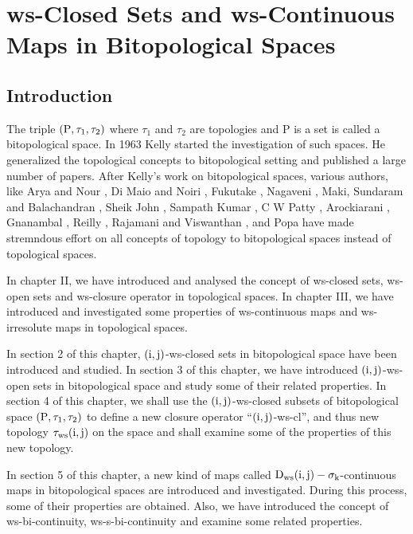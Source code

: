 \chapter{ws-Closed Sets and ws-Continuous Maps in Bitopological Spaces}
\graphicspath{{Chapter8/Chapter8Figs/EPS/}{Chapter8/Chapter8Figs/}}

\section{Introduction}\label{sec8.1}

The triple $(\mathrm{P}, \tau_1, \tau_2)$ where $\tau_1$ and $\tau_2$ are topologies and P is a set is called a bitopological space. In 1963 Kelly \cite{Kelly} started the investigation of such spaces. He generalized the topological concepts to bitopological setting and published a large number of papers. After Kelly's work on bitopological spaces, various authors, like Arya and Nour \cite{Arya2}, Di Maio and Noiri \cite{Noiri2}, Fukutake \cite{Fukutake2}, Nagaveni \cite{Nagaveni7}, Maki, Sundaram and Balachandran \cite{Maki6}, Sheik John \cite{Sheik1}, Sampath Kumar \cite{SampathKumar}, C W Patty \cite{Patty}, Arockiarani \cite{Arockiarani}, Gnanambal \cite{Gnanambal}, Reilly \cite{Reilly}, Rajamani and Viswanthan \cite{Rajamani}, and Popa \cite{Popa1} have made stremndous effort on all concepts of topology to bitopological spaces instead of topological spaces.

In chapter II, we have introduced and analysed the concept of ws-closed sets, ws-open sets and ws-closure operator in topological spaces. In chapter III, we have introduced and investigated some properties of ws-continuous maps and ws-irresolute maps in topological spaces.

In section 2 of this chapter, $(\mathrm{i},\mathrm{j})$-ws-closed sets in bitopological space have been introduced and studied. In section 3 of this chapter, we have introduced $(\mathrm{i}, \mathrm{j})$-ws-open sets in bitopological space and study some of their related properties. In section 4 of this chapter, we shall use the $(\mathrm{i}, \mathrm{j})$-ws-closed subsets of bitopological space $(\mathrm{P}, \tau_1, \tau_2)$ to define a new closure operator ``$(\mathrm{i}, \mathrm{j})$-ws-cl'', and thus new topology $\tau_{\mathrm{ws}}(\mathrm{i}, \mathrm{j})$ on the space and shall examine some of the properties of this new topology.

In section 5 of this chapter, a new kind of maps called $\mathrm{D}_{\mathrm{ws}} (\mathrm{i}, \mathrm{j})-\sigma_{\mathrm{k}}$-continuous maps in bitopological spaces are introduced and investigated. During this process, some of their properties are obtained. Also, we have introduced the concept of ws-bi-continuity, ws-s-bi-continuity and examine some related properties.

